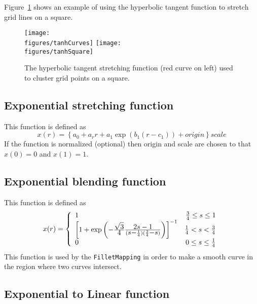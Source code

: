 Figure~\ref{fig:itanhStretch} shows an example of using the hyperbolic tangent function
to stretch grid lines on a square.
\begin{figure}
  \begin{center}
  \texttt{[image: \\figures/tanhCurves]}
  \texttt{[image: \\figures/tanhSquare]}
  \end{center}
  \caption{The hyperbolic tangent stretching function (red curve on left) used to cluster grid points on a square.}\label{fig:itanhStretch}
\end{figure}


\subsection{Exponential stretching function}

This function is defined as
$$
    x(r) = \left\{ a_0 + a_r r + a_1\exp( b_1(r-c_1) ) + origin  \right\} scale
$$
If the function is normalized (optional) then origin and scale are chosen to that $x(0)=0$ and $x(1)=1$. 

\subsection{Exponential blending function}

This function is defined as
\[
  x(r) = \left \{\begin{array}{lr}
 1 & {3\over4} \le s \le 1\\
 \left[1 + \exp\left(-{\displaystyle\sqrt3\over\displaystyle4}
   {\displaystyle2s-1\over
     ({\displaystyle s-}{1\over4})
     ({3\over4}{\displaystyle -s})}\right)\right]^{-1}
 & {1\over4}<s<{3\over4} \\
 0 & 0 \le s \le {1\over4} \\
 \end{array} \right.
\]
This function is used by the {\tt FilletMapping} in order to make a smooth curve
in the region where two curves intersect.



\subsection{Exponential to Linear function}

